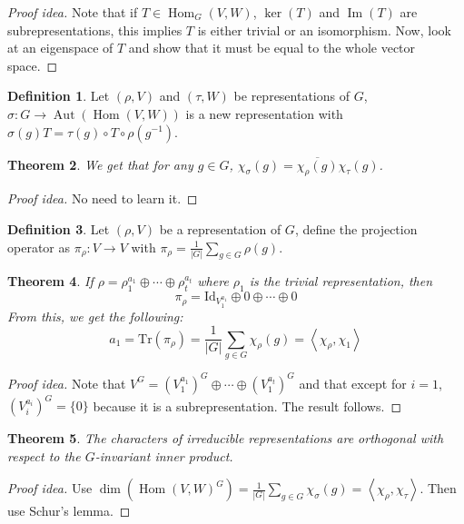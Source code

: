 \documentclass[paper=a4, fontsize=12pt]{scrartcl} %
\newtheorem{thm}{Theorem}
\theoremstyle{definition}
\newtheorem{defn}[thm]{Definition}
\theoremstyle{remark}
\DeclareMathOperator{\aut}{Aut}
\DeclareMathOperator{\im}{Im}
\DeclareMathOperator{\Hom}{Hom}
\newcommand{\inp}[2]{\left\langle #1, #2 \right\rangle}
\begin{document}
\begin{proof}[Proof idea]
	Note that if $T \in \Hom_G(V,W)$, $\ker(T)$ and $\im(T)$ are subrepresentations, this implies $T$ is either trivial or an isomorphism. Now, look at an eigenspace of $T$ and show that it must be equal to the whole vector space.
\end{proof}
\begin{defn}
	Let $(\rho, V)$ and $(\tau, W)$ be representations of $G$, $\sigma : G \rightarrow \aut(\Hom(V,W))$ is a new representation with $\sigma(g) T = \tau(g) \circ T \circ \rho(g^{-1})$.
\end{defn}
\begin{thm}
	We get that for any $g \in G$, $\chi_{\sigma}(g) = \overline{\chi_{\rho}(g)}\chi_{\tau}(g)$.
\end{thm}
\begin{proof}[Proof idea]
	No need to learn it.
\end{proof}
\begin{defn}
	Let $(\rho, V)$ be a representation of $G$, define the projection operator as $\pi_{\rho} : V \rightarrow V$ with $\pi_{\rho} = \frac{1}{|G|} \sum_{g \in G} \rho(g)$.
\end{defn}
\begin{thm}
	If $\rho = \rho_1^{a_1} \oplus \cdots \oplus \rho_t^{a_t}$ where $\rho_1$ is the trivial representation, then $$\pi_{\rho} = \text{Id}_{V_1^{a_1}} \oplus 0 \oplus \cdots \oplus 0$$
	From this, we get the following:
	\[ a_1 = \text{Tr}(\pi_{\rho}) = \frac{1}{|G|}\sum_{g \in G} \chi_{\rho}(g) = \inp{\chi_{\rho}}{\chi_1} \]
\end{thm}
\begin{proof}[Proof idea]
	Note that $V^G = (V_1^{a_1})^G \oplus \cdots \oplus (V_1^{a_t})^G$ and that except for $i = 1$, $(V_i^{a_i})^G = \{0\}$ because it is a subrepresentation. The result follows.
\end{proof}
\begin{thm}
	The characters of irreducible representations are orthogonal with respect to the $G$-invariant inner product.
\end{thm}
\begin{proof}[Proof idea]
	Use $\dim(\Hom(V,W)^G) = \frac{1}{|G|}\sum_{g \in G} \chi_{\sigma}(g) = \inp{\chi_{\rho}}{\chi_{\tau}}$. Then use Schur's lemma.
\end{proof}
\end{document}
